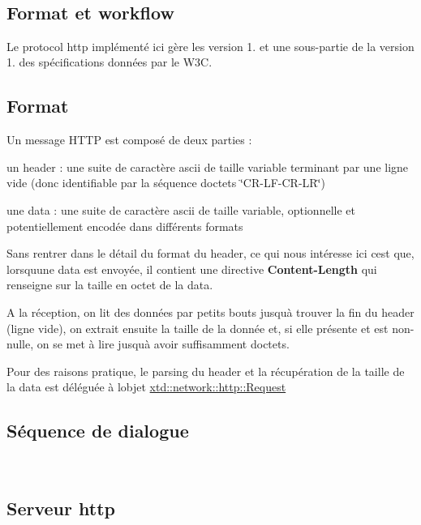 ~\newline
 \hypertarget{index_ssec_http_cnx}{}\subsection{Format et workflow}\label{index_ssec_http_cnx}
Le protocol http implémenté ici gère les version 1. et une sous-\/partie de la version 1. des spécifications données par le W3C. \subsection*{Format}

Un message H\+T\+TP est composé de deux parties \+:
\begin{DoxyItemize}
\item un header \+: une suite de caractère ascii de taille variable terminant par une ligne vide (donc identifiable par la séquence d\textquotesingle{}octets \char`\"{}\+C\+R-\/\+L\+F-\/\+C\+R-\/\+L\+R\char`\"{})
\item une data \+: une suite de caractère ascii de taille variable, optionnelle et potentiellement encodée dans différents formats
\end{DoxyItemize}

Sans rentrer dans le détail du format du header, ce qui nous intéresse ici c\textquotesingle{}est que, lorsqu\textquotesingle{}une data est envoyée, il contient une directive {\bfseries Content-\/\+Length} qui renseigne sur la taille en octet de la data.

A la réception, on lit des données par petits bouts jusqu\textquotesingle{}à trouver la fin du header (ligne vide), on extrait ensuite la taille de la donnée et, si elle présente et est non-\/nulle, on se met à lire jusqu\textquotesingle{}à avoir suffisamment d\textquotesingle{}octets.

Pour des raisons pratique, le parsing du header et la récupération de la taille de la data est déléguée à l\textquotesingle{}objet \hyperlink{classxtd_1_1network_1_1http_1_1Request}{xtd\+::network\+::http\+::\+Request}

\subsection*{Séquence de dialogue }



~\newline
 \hypertarget{index_ssec_http_server}{}\subsection{Serveur http}\label{index_ssec_http_server}
~\newline
~\newline
 
